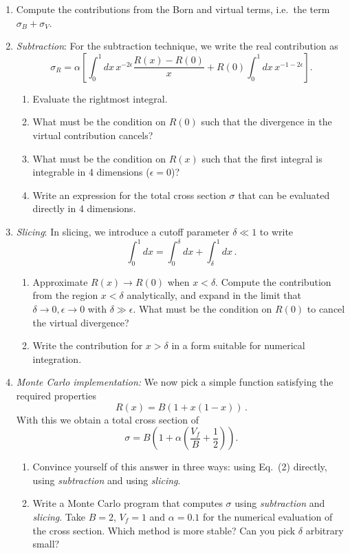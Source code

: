 \documentclass{article}
\begin{document}
\begin{enumerate}
	\item Compute the contributions from the Born and virtual terms, i.e.\ the term $\sigma_B+ \sigma_V$.
	\item \emph{Subtraction}: For the subtraction technique, we write the real contribution as
	\[
	\sigma_R = \alpha \left[\int_0^1 dx\,  x^{-2\epsilon} \frac{R(x) - R(0)}{x} + R(0)\int_0^1 dx \, x^{-1-2\epsilon} \right].
	\]
	\begin{enumerate}
		\item Evaluate the rightmost integral. 
		\item What must be the condition on $R(0)$ such that the divergence in the virtual contribution cancels?
		\item What must be the condition on $R(x)$ such that the first integral is integrable in 4 dimensions ($\epsilon = 0$)?
		\item Write an expression for the total cross section $\sigma$ that can be evaluated directly in 4 dimensions. 
	\end{enumerate}
	\item \emph{Slicing}: In slicing, we introduce a cutoff parameter $\delta \ll 1$ to write
	\[
	\int_0^1 dx = \int_0^{\delta} dx + \int_{\delta}^1 dx\,.
	\]
	\begin{enumerate} 
		\item Approximate $R(x) \to R(0)$ when $x < \delta$. Compute the contribution from the region $x < \delta$ analytically, and expand in the limit that $\delta \to 0, \epsilon \to 0$ with $\delta \gg \epsilon$. 
		What must be the condition on $R(0)$ to cancel the virtual divergence?
		\item Write the contribution for $x > \delta$ in a form suitable for numerical integration. 
	\end{enumerate}
	\item \emph{Monte Carlo implementation:} We now pick a simple function satisfying the required properties
	\[
	R(x) = B(1+x(1-x))\,.
	\]
	With this we obtain a total cross section of
	\[
	\sigma = B\left(1 + \alpha\left(\frac{V_f}{B} + \frac{1}{2}\right)\right).
	\]
	\begin{enumerate}
		\item Convince yourself of this answer in three ways: using Eq.~(2) directly, using \emph{subtraction} and using \emph{slicing}. 
		\item Write a Monte Carlo program that computes $\sigma$ using \emph{subtraction} and \emph{slicing}. Take $B = 2$, $V_f = 1$ and $\alpha = 0.1$ for the numerical evaluation of the cross section. Which method is more stable? Can you pick $\delta$ arbitrary small? 
	\end{enumerate}
\end{enumerate}
\end{document}
